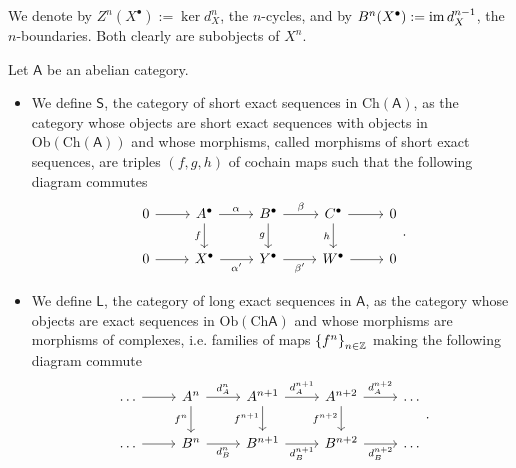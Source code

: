 \begin{rem}[Notation]
	We denote by $Z^n(X^\bullet) := \ker d_X^n$, the $n$-cycles,
	and by $B^n(X^\bullet) := \operatorname{im} d_X^{n-1}$, the $n$-boundaries.
	Both clearly are subobjects of $X^n$.
\end{rem}

\begin{defn}
	Let $\mathsf{A}$ be an abelian category.
	\begin{itemize}
		\item We define $\mathsf{S}$, the category of short exact sequences
	in $\mathrm{Ch}(\mathsf{A})$, as the category whose objects
	are short exact sequences with objects in $\mathrm{Ob} \left(\mathrm{Ch}(\mathsf{A})\right)$
	and whose morphisms, called morphisms of short exact sequences,
	are triples $(f,g,h)$ of cochain maps such that
	the following diagram commutes
	\begin{equation}
	\begin{tikzcd}
		0 \arrow[r, "", rightarrow] &
		A^\bullet \arrow[r, "\alpha", rightarrow] \arrow[d, "f"', rightarrow] &
		B^\bullet \arrow[r, "\beta", rightarrow] \arrow[d, "g"', rightarrow] &
		C^\bullet \arrow[r, "", rightarrow] \arrow[d, "h"', rightarrow] &
		0 \\
		0 \arrow[r, "", rightarrow] &
		X^\bullet \arrow[r, "\alpha'"', rightarrow] &
		Y^\bullet \arrow[r, "\beta'"', rightarrow] &
		W^\bullet \arrow[r, "", rightarrow] &
		0 
	\end{tikzcd}
	.\end{equation} 
		\item We define $\mathsf{L}$, the category of long exact sequences
	in $\mathsf{A}$, as the category whose objects
	are exact sequences in $\mathrm{Ob} \left(\mathrm{Ch}\mathsf{A}\right)$
	and whose morphisms are morphisms of complexes, i.e.
	families of maps $\left\{ f^n \right\}_{n \in \mathbb{Z}}$ making
	the following diagram commute
	\begin{equation}
	\begin{tikzcd}
		\ldots \arrow[r, "", rightarrow] &
		A^n \arrow[r, "d_A^n", rightarrow] \arrow[d, "f^n"', rightarrow] &
		A^{n+1} \arrow[r, "d_A^{n+1}", rightarrow] \arrow[d, "f^{n+1}"', rightarrow] &
		A^{n+2} \arrow[r, "d_A^{n+2}", rightarrow] \arrow[d, "f^{n+2}"', rightarrow] &
		\ldots \\
		\ldots \arrow[r, "", rightarrow] &
		B^n \arrow[r, "d_B^n"', rightarrow] &
		B^{n+1} \arrow[r, "d_B^{n+1}"', rightarrow] &
		B^{n+2} \arrow[r, "d_B^{n+2}"', rightarrow] &
		\ldots 
	\end{tikzcd}
	.\end{equation} 
	\end{itemize}
\end{defn}

